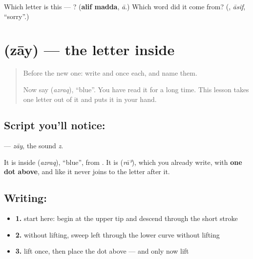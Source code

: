 \begin{tcolorbox}[breakable,colback=teal!4,colframe=teal!35!black,title={Before you move on}]
Which letter is this — ? (\textbf{alif madda}, \emph{ā}.) Which word did it come from? (\textbf{}, \emph{āsif}, \textquotedblleft{}sorry\textquotedblright{}.)
\end{tcolorbox}
\section[\texorpdfstring{\ar{ز} (zāy)}{ز (zāy)}]{ (zāy) — the letter inside }

\label{lesson:AR-W48-zay}



\begin{quote}
Before the new one: write  and  once each, and name them.

Now say \textbf{} (\emph{azraq}), \textquotedblleft{}blue\textquotedblright{}. You have read it for a long time. This lesson takes one letter out of it and puts it in your hand.
\end{quote}

\subsection*{Script you'll notice: }
\textbf{} — \emph{zāy}, the sound \emph{z}.

It is inside \textbf{} (\emph{azraq}), \textquotedblleft{}blue\textquotedblright{}, from \textbf{ }. It is \textbf{} (\emph{rāʾ}), which you already write, with \textbf{one dot above}, and like \textbf{} it never joins to the letter after it.

\subsection*{Writing: }

\begin{itemize}
\raggedright
  \item \textbf{1.} start here: begin at the upper tip and descend through the short stroke
  \item \textbf{2.} without lifting, sweep left through the lower curve without lifting
  \item \textbf{3.} lift once, then place the dot above — and only now lift
\end{itemize}

